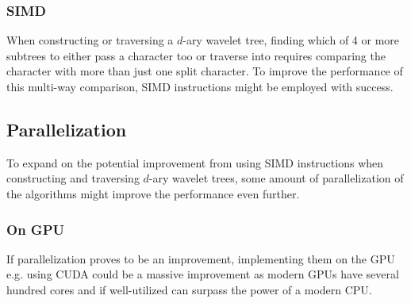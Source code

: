 \subsubsection{SIMD}
When constructing or traversing a $d$-ary wavelet tree, finding which of 4 or more subtrees to either pass a character too or traverse into requires comparing the character with more than just one split character.
To improve the performance of this multi-way comparison, SIMD instructions might be employed with success.


\subsection{Parallelization}
To expand on the potential improvement from using SIMD instructions when constructing and traversing $d$-ary wavelet trees, some amount of parallelization of the algorithms might improve the performance even further.
\subsubsection{On GPU}
If parallelization proves to be an improvement, implementing them on the GPU e.g. using CUDA could be a massive improvement as modern GPUs have several hundred cores and if well-utilized can surpass the power of a modern CPU.

